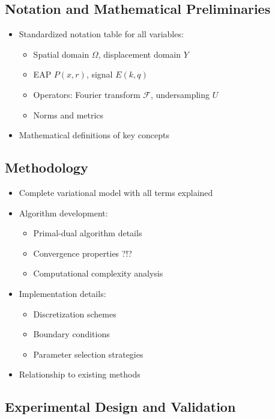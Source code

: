 \documentclass[journal,twoside,web]{ieeecolor}
\begin{document}
\subsection{Notation and Mathematical Preliminaries}
\begin{itemize}
    \item Standardized notation table for all variables:
    \begin{itemize}
        \item Spatial domain $\Omega$, displacement domain $Y$
        \item EAP $P(x,r)$, signal $E(k,q)$
        \item Operators: Fourier transform $\mathcal{F}$, undersampling $U$
        \item Norms and metrics
    \end{itemize}
    \item Mathematical definitions of key concepts
\end{itemize}

\subsection{Methodology}
\begin{itemize}
    \item Complete variational model with all terms explained
    \item Algorithm development:
    \begin{itemize}
        \item Primal-dual algorithm details
        \item Convergence properties ?!?
        \item Computational complexity analysis
    \end{itemize}
    \item Implementation details:
    \begin{itemize}
        \item Discretization schemes
        \item Boundary conditions
        \item Parameter selection strategies
    \end{itemize}
    \item Relationship to existing methods
\end{itemize}

\subsection{Experimental Design and Validation}
\end{document}

